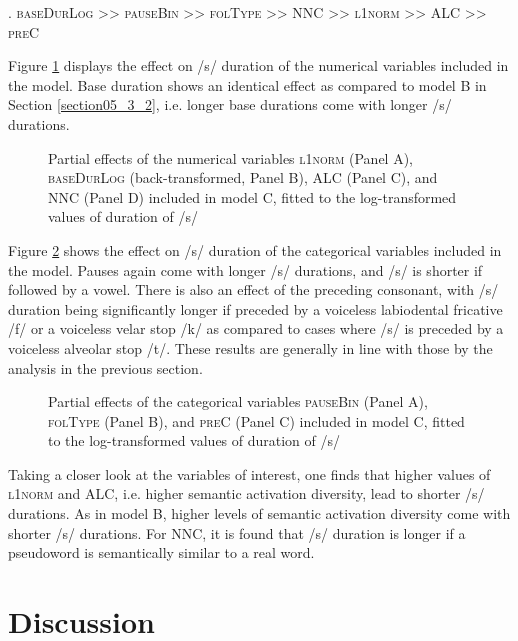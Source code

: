 \ex.
\label{ex:5.3}
\textsc{baseDurLog >> pauseBin >> folType >> NNC >> l1norm >> ALC >> preC}

Figure \ref{fig:5_3} displays the effect on /s/ duration of the numerical variables included in the model. Base duration shows an identical effect as compared to model B in Section \ref{section05_3_2}, i.e. longer base durations come with longer /s/ durations. 

\begin{figure}
    \centering
    
    \caption{Partial effects of the numerical variables \textsc{l1norm} (Panel A), \textsc{baseDurLog} (back-transformed, Panel B), \textsc{ALC} (Panel C), and \textsc{NNC} (Panel D) included in model C, fitted to the log-transformed values of duration of /s/}
    \label{fig:5_3}
\end{figure}

Figure \ref{fig:5_4} shows the effect on /s/ duration of the categorical variables included in the model. Pauses again come with longer /s/ durations, and /s/ is shorter if followed by a vowel. There is also an effect of the preceding consonant, with /s/ duration being significantly longer if preceded by a voiceless labiodental fricative /f/ or a voiceless velar stop /k/ as compared to cases where /s/ is preceded by a voiceless alveolar stop /t/. These results are generally in line with those by the analysis in the previous section.

\begin{figure}
    \centering
    
    \caption{Partial effects of the categorical variables \textsc{pauseBin} (Panel A), \textsc{folType} (Panel B), and \textsc{preC} (Panel C) included in model C, fitted to the log-transformed values of duration of /s/}
    \label{fig:5_4}
\end{figure}

Taking a closer look at the variables of interest, one finds that higher values of \textsc{l1norm} and \textsc{ALC}, i.e. higher semantic activation diversity, lead to shorter /s/ durations. As in model B, higher levels of semantic activation diversity come with shorter /s/ durations. For \textsc{NNC}, it is found that /s/ duration is longer if a pseudoword is semantically similar to a real word.

\section{Discussion}\label{section05_4}


